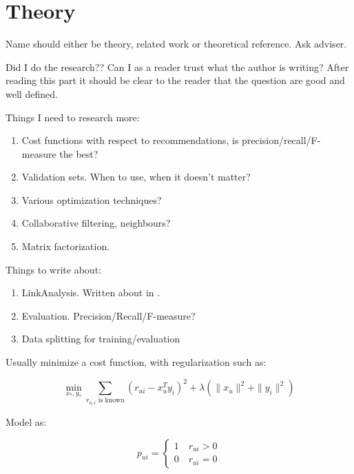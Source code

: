 

\chapter{Theory}\label{cha:theory}

Name should either be theory, related work or theoretical reference. Ask adviser.

Did I do the research?? Can I as a reader trust what the author is writing? After reading this part it should be clear to the reader that the question are good and well defined.

Things I need to research more:

\begin{enumerate}
    \item Cost functions with respect to recommendations, is precision/recall/F-measure the best?
    \item Validation sets. When to use, when it doesn't matter?
    \item Various optimization techniques?
    \item Collaborative filtering, neighbours? \cite{Yifan:2008}
    \item Matrix factorization.
\end{enumerate}

Things to write about:

\begin{enumerate}
    \item LinkAnalysis. Written about in \cite{Zan:2007}.
    \item Evaluation. Precision/Recall/F-measure?
    \item Data splitting for training/evaluation
\end{enumerate}

Usually minimize a cost function, with regularization such as:

\begin{equation}
    \min_{x_*, y_*} \sum_{r_{u,i} \text{ is known} } (r_{ui} - x_{u}^T y_i)^2 + \lambda(\|x_u\|^2 + \|y_i\|^2)
\end{equation}

Model as:

\begin{equation}
    p_{ui} = \begin{cases}
        1 \quad r_{ui} > 0 \\
        0 \quad r_{ui} = 0
    \end{cases}
\end{equation}

